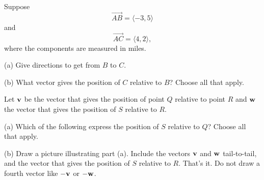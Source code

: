 \documentclass{ximera}
\begin{document}
\begin{question}  \label{Qsdfsdt4r3:Vectors}
Suppose
\[
 \overrightarrow{AB} = \langle  -3,5 \rangle
\]
and
\[
   \overrightarrow{AC} = \langle  4,2 \rangle ,
\]
where the components are measured in miles.

(a) Give directions to get from $B$ to $C$.

(b) What vector gives the position of $C$ relative to $B$? Choose all that apply.
\begin{multipleChoice} 
\end{multipleChoice} 

\end{question}





\begin{question}  \label{Q234r3:Vectors}
Let ${\bf v}$ be the vector that gives the position of point $Q$ relative to point $R$ and ${\bf w}$ the vector that gives the position of $S$ relative to $R$. 

(a) Which of the following express the position of $S$ relative to $Q$? Choose all that apply.

\begin{selectAll}  
\end{selectAll}

(b) Draw a picture illustrating part (a). Include the vectors ${\bf v}$ and ${\bf w}$ tail-to-tail, and the vector that gives the position of $S$ relative to $R$. That's it. Do not draw a fourth vector like $-{\bf v}$ or $-{\bf w}$.


\end{question}
\end{document}
